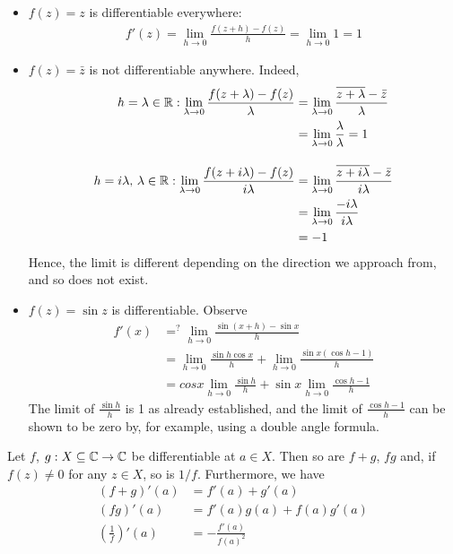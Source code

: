\documentclass{../../template/note}
\begin{document}
    \begin{example*}
        \begin{itemize}
            \item \(f(z) = z\) is differentiable everywhere:
            \begin{align*}
                f'(z) = \lim_{h \to 0} \frac{f(z+h)-f(z)}{h} = \lim_{h \to 0} 1 = 1
            \end{align*}
            \item \(f(z) = \bar z\) is not differentiable anywhere. Indeed,
            \begin{align*}
                h = \lambda \in \mathbb R: \lim_{\lambda \to 0} \frac{f(z+\lambda)-f(z)}{\lambda} &= \lim_{\lambda \to 0} \frac{\overline{z+\lambda}-\bar z}{\lambda} \\
                &= \lim_{\lambda \to 0} \frac{\lambda}{\lambda} = 1 \\[10pt]
                h = i\lambda, \, \lambda \in \mathbb R: \lim_{\lambda \to 0} \frac{f(z+i\lambda)-f(z)}{i\lambda} &= \lim_{\lambda \to 0} \frac{\overline{z+i\lambda}-\bar z}{i\lambda} \\
                &= \lim_{\lambda \to 0} \frac{-i\lambda}{i\lambda} \\
                &= -1
            \end{align*}
            Hence, the limit is different depending on the direction we approach from, and so does not exist.
            \item \(f(z) = \sin z\) is differentiable. Observe
            \begin{align*}
                f'(x) &=^? \lim_{h \to 0} \frac{\sin(x+h)-\sin x}{h} \\
                &= \lim_{h \to 0} \frac{\sin h \cos x}{h} + \lim_{h \to 0} \frac{\sin x(\cos h-1)}{h} \\ 
                &= cos x \lim_{h \to 0} \frac{\sin h}{h} + \sin x \lim_{h \to 0} \frac{\cos h - 1}{h}
            \end{align*}
            The limit of \(\frac{\sin h}{h}\) is 1 as already established, and the limit of \(\frac{\cos h-1}{h}\) can be shown to be zero by, for example, using a double angle formula.  
        \end{itemize}
    \end{example*}

    \begin{lemma}
        Let \(f\), \(g: X \subseteq \mathbb C \to \mathbb C\) be differentiable at \(a \in X\). Then so are \(f+g\), \(fg\) and, if \(f(z) \neq 0\) for any \(z \in X\), so is \(1/f\). Furthermore, we have
        \begin{align*}
            (f+g)'(a) &= f'(a) + g'(a) \\
            (fg)'(a) &= f'(a)g(a) + f(a)g'(a) \\
            \left(\frac 1 f\right)'(a) &= -\frac{f'(a)}{f(a)^2}
        \end{align*}
    \end{lemma}
    
\end{document}
